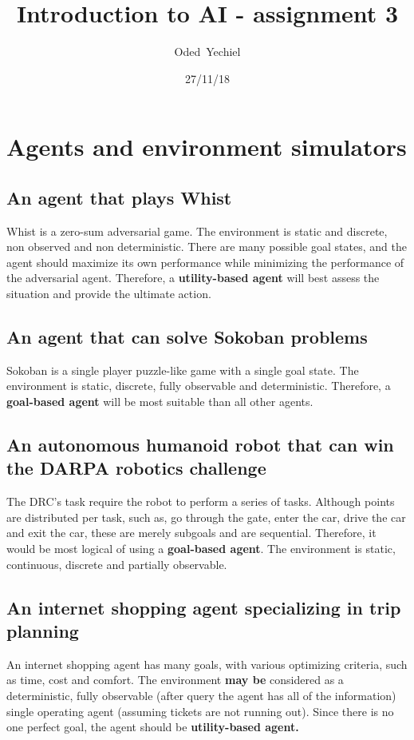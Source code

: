 \documentclass{article}                     %
\begin{document}
	
	\title{Introduction to AI - assignment 3}
	
	
	\author{Oded~Yechiel}
	
	\date{27/11/18}
	
	\maketitle
	
	\section{Agents and environment simulators}
	\subsection{An agent that plays Whist}
	Whist is a zero-sum adversarial game. The environment is static and discrete, non observed and non deterministic. There are many possible goal states, and the agent should maximize its own performance while minimizing the performance of the adversarial agent. Therefore, a \textbf{utility-based agent} will best assess the situation and provide the ultimate action.
	\subsection{An agent that can solve Sokoban problems}
	Sokoban is a single player puzzle-like game with a single goal state. The environment is static, discrete, fully observable and deterministic. Therefore, a \textbf{goal-based agent} will be most suitable than all other agents.
	\subsection{An autonomous humanoid robot that can win the DARPA robotics challenge}
	The DRC's task require the robot to perform a series of tasks. Although points are distributed per task, such as, go through the gate, enter the car, drive the car and exit the car, these are merely subgoals and are sequential. Therefore, it would be most logical of using a \textbf{goal-based agent}. The environment is static, continuous, discrete and partially observable.
	\subsection{An internet shopping agent specializing in trip planning}
	An internet shopping agent has many goals, with various optimizing criteria, such as time, cost and comfort. The environment \textbf{may be} considered as a deterministic, fully observable (after query the agent has all of the information) single operating agent (assuming tickets are not running out). Since there is no one perfect goal, the agent should be \textbf{utility-based agent.}
\end{document}
